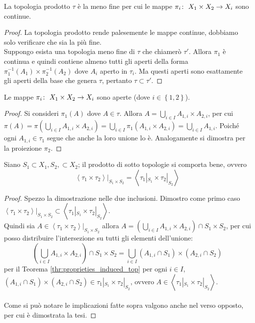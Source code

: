 \begin{theorem}
	La topologia prodotto $\tau$ è la meno fine per cui le mappe $\pi_i \colon\ X_1\times X_2 \rightarrow X_i$ sono continue.
\end{theorem}
\begin{proof}
	La topologia prodotto rende palesemente le mappe continue, dobbiamo solo verificare che sia la più fine. \\
	Suppongo esista una topologia meno fine di $\tau$ che chiamerò $\tau'$. Allora $\pi_1$ è continua e quindi contiene almeno tutti gli aperti della forma $\pi^{-1}_1(A_1) \times \pi^{-1}_2(A_2)$ dove $A_i$ aperto in $\tau_i$. Ma questi aperti sono esattamente gli aperti della base che genera $\tau$, pertanto $\tau \subset \tau'$.
\end{proof}

\begin{theorem}
	Le mappe $\pi_i \colon\ X_1\times X_2 \rightarrow X_i$ sono aperte (dove $i \in \left\{1,2\right\}$). 
\end{theorem}
\begin{proof}
	Si consideri $\pi_1(A)$ dove $A \in \tau$. Allora $A = \bigcup_{i \in I} A_{1,i} \times A_{2,i}$, per cui $\pi(A) = \pi(\bigcup_{i \in I} A_{1,i} \times A_{2,i}) = \bigcup_{i\in I} \pi_1 (A_{1,i} \times A_{2,i}) = \bigcup_{i \in I} A_{1,i}$. Poiché ogni $A_{1,i} \in \tau_1$ segue che anche la loro unione lo è. Analogamente si dimostra per la proiezione $\pi_2$.
\end{proof}

\begin{theorem}
	Siano $S_1 \subset X_1, S_2, \subset X_2$; il prodotto di sotto topologie si comporta bene, ovvero
	\begin{equation*}
		\left\langle \tau_1 \times \tau_2 \right\rangle|_{S_1 \times S_2} = \left\langle \tau_1|_{S_1} \times \tau_2|_{S_2} \right\rangle 
	\end{equation*}
\end{theorem}
\begin{proof}
	Spezzo la dimostrazione nelle due inclusioni. Dimostro come primo caso $	\left\langle \tau_1 \times \tau_2 \right\rangle|_{S_1 \times S_2} \subset \left\langle \tau_1|_{S_1} \times \tau_2|_{S_2} \right\rangle$. \\ Quindi sia $A \in \left\langle \tau_1 \times \tau_2 \right\rangle|_{S_1 \times S_2}$ allora $A = \left( \bigcup_{i \in I} A_{1,i} \times A_{2,i} \right) \cap S_1 \times S_2$, per cui posso distribuire l'intersezione su tutti gli elementi dell'unione:
	\begin{equation*}
		\left( \bigcup_{i \in I} A_{1,i} \times A_{2,i} \right) \cap S_1 \times S_2 = \bigcup_{i \in I} (A_{1,i} \cap S_1) \times (A_{2,i} \cap S_2)
	\end{equation*}
	per il Teorema \ref{thr:proprieties_induced_top} per ogni $i \in I$, $(A_{1,i} \cap S_1) \times (A_{2,i} \cap S_2) \in \tau_1|_{S_1} \times \tau_2|_{S_2}$, ovvero $A \in \left\langle \tau_1|_{S_1} \times \tau_2|_{S_2} \right\rangle$. \\ \\ Come si può notare le implicazioni fatte sopra valgono anche nel verso opposto, per cui è dimostrata la tesi.
\end{proof}

